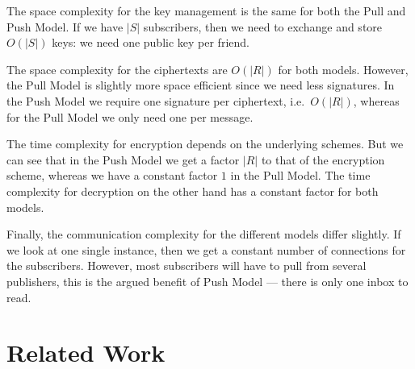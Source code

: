 The space complexity for the key management is the same for both the Pull and 
Push Model.
If we have \(|S|\) subscribers, then we need to exchange and store \(O(|S|)\) 
keys:
we need one public key per friend.

The space complexity for the ciphertexts are \(O(|R|)\) for both models.
However, the Pull Model is slightly more space efficient since we need less 
signatures.
In the Push Model we require one signature per ciphertext, i.e.\ \(O(|R|)\), 
whereas for the Pull Model we only need one per message.

The time complexity for encryption depends on the underlying schemes.
But we can see that in the Push Model we get a factor \(|R|\) to that of the 
encryption scheme, whereas we have a constant factor \(1\) in the Pull 
Model.
The time complexity for decryption on the other hand has a constant factor for 
both models.

Finally, the communication complexity for the different models differ slightly.
If we look at one single instance, then we get a constant number of connections
for the subscribers.
However, most subscribers will have to pull from several publishers, this is 
the argued benefit of Push Model --- there is only one inbox to read.

%


\section{Related Work}\label{RelatedWork}

